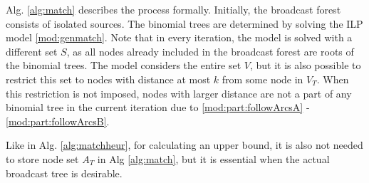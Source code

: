 Alg. \ref{alg:match} describes the process formally.
Initially, the broadcast forest consists of isolated sources.
The binomial trees are determined by solving the ILP model \eqref{mod:genmatch}. 
Note that in every iteration, the model is solved with a different set $S$, as all nodes already included in the broadcast forest are roots of the binomial trees.
The model considers the entire set $V$, but it is also possible to restrict this set to nodes with distance at most $k$ from some node in $V_T$.
When this restriction is not imposed, nodes with larger distance are not a part of any binomial tree in the current iteration due to \eqref{mod:part:followArcsA} - \eqref{mod:part:followArcsB}.

Like in Alg. \ref{alg:matchheur}, for calculating an upper bound, it is also not needed to store node set $A_T$ in Alg \ref{alg:match}, but it is essential when the actual broadcast tree is desirable.

%
%
%
%
%
